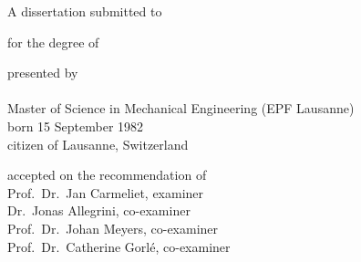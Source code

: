 \begin{titlepage}
    \begin{center}
        \large
        \begingroup
        \endgroup

        \hfill

        \vfill

        \begingroup
            \spacedallcaps{\myTitle}
        \endgroup

        \vfill

        \begingroup
            A dissertation submitted to\\
        \endgroup
        
        \vfill

        \begingroup
            for the degree of\\
        \endgroup

        \vfill

        \begingroup
            presented by\\
            \spacedlowsmallcaps{\myName}\\
            Master of Science in Mechanical Engineering (EPF Lausanne)\\
            born 15 September 1982\\
            citizen of Lausanne, Switzerland
        \endgroup

        \vfill

        \begingroup
            accepted on the recommendation of\\
            Prof.\ Dr.\ Jan Carmeliet, examiner\\
            Dr.\ Jonas Allegrini, co-examiner\\
            Prof.\ Dr.\ Johan Meyers, co-examiner\\
            Prof.\ Dr.\ Catherine Gorl\'e, co-examiner
        \endgroup


        \vfill

        \myTime

        \vfill                      

    \end{center}  
\end{titlepage}   
